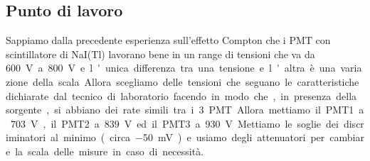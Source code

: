 \subsection{Punto di lavoro}

Sappiamo dalla precedente esperienza sull'effetto Compton che i PMT con scintillatore di NaI(Tl) lavorano bene in un range di tensioni che va da \SI{600}V a \SI{800}V e l'unica differenza tra una tensione e l'altra è una variazione della scala.
Allora scegliamo delle tensioni che seguano le caratteristiche dichiarate dal tecnico di laboratorio facendo in modo che, in presenza della sorgente, si abbiano dei rate simili tra i 3 PMT.
Allora mettiamo il PMT1 a \SI{703}V, il PMT2 a \SI{839}V ed il PMT3 a \SI{930}V.

Mettiamo le soglie dei discriminatori al minimo (circa \SI{-50}{mV}) e usiamo degli attenuatori per cambiare la scala delle misure in caso di necessità.